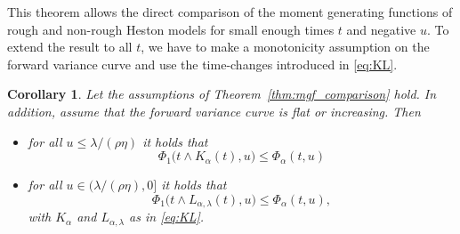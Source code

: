 \documentclass[12pt,a4paper]{amsart}
\numberwithin{equation}{section}
\numberwithin{equation}{section}
\newtheorem{corollary}[theorem]{Corollary}
\theoremstyle{nonumberplain}
\begin{document}
This theorem allows the direct comparison of the moment generating functions of rough and non-rough Heston models for small enough times $t$ and negative $u$. To extend the result to all $t$, we have to make a monotonicity assumption on the forward variance curve and use the time-changes introduced in \eqref{eq:KL}.

\begin{corollary}\label{cor:mgf_comparison}
Let the assumptions of Theorem~\ref{thm:mgf_comparison} hold. In addition, assume that the forward variance curve is flat or increasing. Then
\begin{itemize}
\item[(a)] for all $u \le \lambda/(\rho \eta)$ it holds that 
\[\Phi_1\Big(t \wedge K_\alpha(t),u\Big) \le \Phi_\alpha(t,u)\]
\item[(b)] for all $u \in (\lambda/(\rho \eta),0]$ it holds that 
\[\Phi_1\Big(t \wedge L_{\alpha,\lambda}(t),u\Big) \le \Phi_\alpha(t,u),\]
with $K_\alpha$ and $L_{\alpha,\lambda}$ as in \eqref{eq:KL}.
\end{itemize}
\end{corollary}
\end{document}
